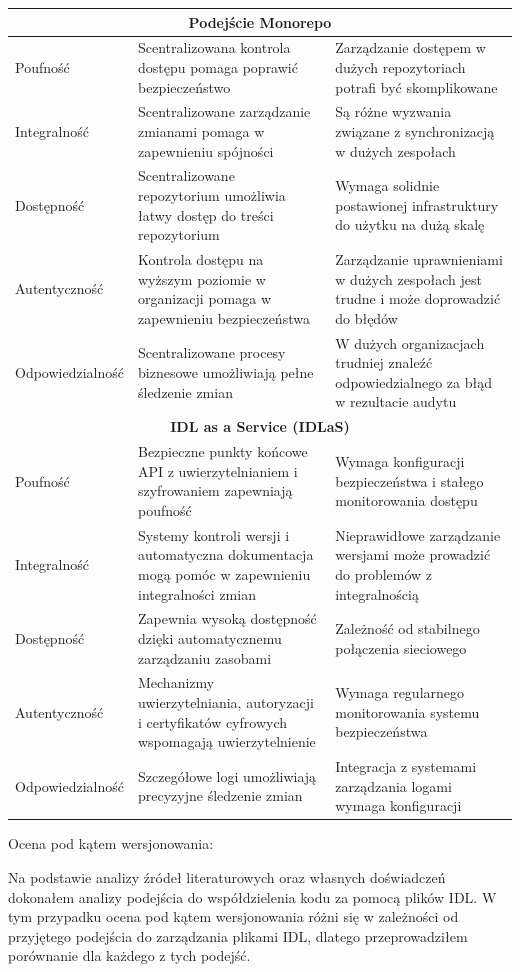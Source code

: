 \documentclass[runningheads,12pt]{llncs}
\begin{document}
\begin{longtable}{|p{4cm}|p{4cm}|p{4cm}|}
    \multicolumn{3}{|c|}{\textbf{Podejście Monorepo}} \\ \hline
    Poufność & Scentralizowana kontrola dostępu pomaga poprawić bezpieczeństwo & Zarządzanie dostępem w dużych repozytoriach potrafi być skomplikowane \\ \hline
    Integralność & Scentralizowane zarządzanie zmianami pomaga w zapewnieniu spójności & Są różne wyzwania związane z synchronizacją w dużych zespołach \\ \hline
    Dostępność & Scentralizowane repozytorium umożliwia łatwy dostęp do treści repozytorium & Wymaga solidnie postawionej infrastruktury do użytku na dużą skalę \\ \hline
    Autentyczność & Kontrola dostępu na wyższym poziomie w organizacji pomaga w zapewnieniu bezpieczeństwa & Zarządzanie uprawnieniami w dużych zespołach jest trudne i może doprowadzić do błędów \\ \hline
    Odpowiedzialność & Scentralizowane procesy biznesowe umożliwiają pełne śledzenie zmian & W dużych organizacjach trudniej znaleźć odpowiedzialnego za błąd w rezultacie audytu \\ \hline
    \multicolumn{3}{|c|}{\textbf{IDL as a Service (IDLaS)}} \\ \hline
    Poufność & Bezpieczne punkty końcowe API z uwierzytelnianiem i szyfrowaniem zapewniają poufność & Wymaga konfiguracji bezpieczeństwa i stałego monitorowania dostępu \\ \hline
    Integralność & Systemy kontroli wersji i automatyczna dokumentacja mogą pomóc w zapewnieniu integralności zmian & Nieprawidłowe zarządzanie wersjami może prowadzić do problemów z integralnością \\ \hline
    Dostępność & Zapewnia wysoką dostępność dzięki automatycznemu zarządzaniu zasobami & Zależność od stabilnego połączenia sieciowego \\ \hline
    Autentyczność & Mechanizmy uwierzytelniania, autoryzacji i certyfikatów cyfrowych wspomagają uwierzytelnienie & Wymaga regularnego monitorowania systemu bezpieczeństwa \\ \hline
    Odpowiedzialność & Szczegółowe logi umożliwiają precyzyjne śledzenie zmian & Integracja z systemami zarządzania logami wymaga konfiguracji \\ \hline
\end{longtable}

Ocena pod kątem wersjonowania:

Na podstawie analizy źródeł literaturowych oraz własnych doświadczeń dokonałem analizy podejścia do współdzielenia kodu za pomocą plików IDL. W tym przypadku ocena pod kątem wersjonowania różni się w zależności od przyjętego podejścia do zarządzania plikami IDL, dlatego przeprowadziłem porównanie dla każdego z tych podejść.
\end{document}
